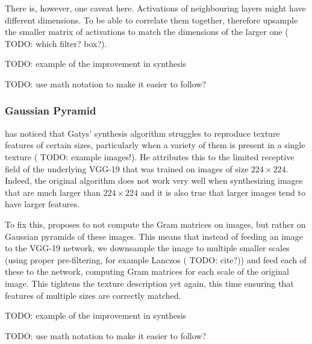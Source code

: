 There is, however, one caveat here. Activations of neighbouring layers might have different dimensions. To be able to correlate them together, \citet{Novak2016} therefore upsample the smaller matrix of activations to match the dimensions of the larger one ({\color{red} TODO: which filter? box?}).

{\color{red} TODO: example of the improvement in synthesis}

{\color{red} TODO: use math notation to make it easier to follow?}

\subsubsection{Gaussian Pyramid}
\label{section:methods-texture_model-improvements-gaussian_pyramid}

\citet{Snelgrove2017} has noticed that Gatys' synthesis algorithm struggles to reproduce texture features of certain sizes, particularly when a variety of them is present in a single texture ({\color{red} TODO: example images!}). He attributes this to the limited receptive field of the underlying VGG-19 that was trained on images of size \(224 \times 224\). Indeed, the original algorithm does not work very well when synthesizing images that are much larger than \(224 \times 224\) and it is also true that larger images tend to have larger features.

To fix this, \citet{Snelgrove2017} proposes to not compute the Gram matrices on images, but rather on Gaussian pyramids of these images. This means that instead of feeding an image to the VGG-19 network, we downsample the image to multiple smaller scales (using proper pre-filtering, for example Lanczos ({\color{red} TODO: cite?})) and feed each of these to the network, computing Gram matrices for each scale of the original image. This tightens the texture description yet again, this time ensuring that features of multiple sizes are correctly matched.

{\color{red} TODO: example of the improvement in synthesis}

{\color{red} TODO: use math notation to make it easier to follow?}